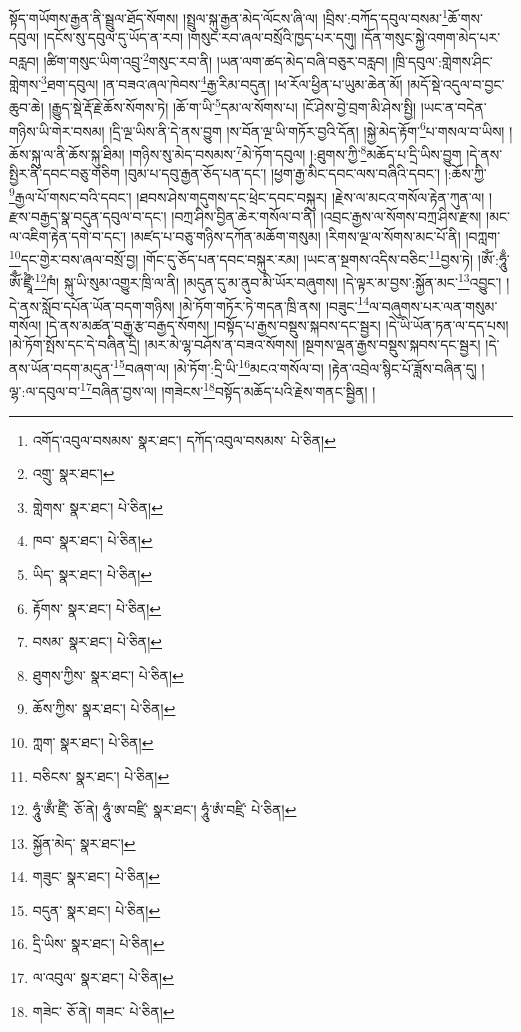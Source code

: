 སྟོད་གཡོགས་རྒྱན་ནི་སྦྲུལ་ཐོད་སོགས། །སྤྲུལ་སྐུ་རྒྱན་མེད་ལོངས་ཞི་ལ། །བྲིས་:བཀོད་དབུལ་བསམ་\footnote{འགོད་འབུལ་བསམས་  སྣར་ཐང་། དཀོད་འབུལ་བསམས་  པེ་ཅིན། }ཆོ་གས་དབུལ། །དངོས་སུ་དབུལ་དུ་ཡོད་ན་རབ། །གསུང་རབ་ཞལ་བསྲོའི་ཁྱད་པར་དགུ། །དོན་གསུང་སྐྱེ་འགག་མེད་པར་བརླབ། །ཚིག་གསུང་ཡིག་འབྲུ་\footnote{འགྲུ་  སྣར་ཐང་། }གསུང་རབ་ནི། །ཡན་ལག་ཚད་མེད་བཞི་བཅུར་བརླབ། །ཁྲི་དབུལ་:གླེགས་ཤིང་གླེགས་\footnote{གླེགས་  སྣར་ཐང་།  པེ་ཅིན། }ཐག་དབུལ། །ན་བཟའ་ཞལ་ཁེབས་\footnote{ཁབ་  སྣར་ཐང་།  པེ་ཅིན། }རྒྱ་རིམ་བདུན། །ཕ་རོལ་ཕྱིན་པ་ཡུམ་ཆེན་མོ། །མདོ་སྡེ་འདུལ་བ་བྱང་ཆུབ་ཆེ། །རྒྱུད་སྡེ་རྡོ་རྗེ་ཆོས་སོགས་ཏེ། །ཆོ་ག་ཡི་\footnote{ཡིད་  སྣར་ཐང་།  པེ་ཅིན། }དམ་ལ་སོགས་པ། །ངོ་ཤེས་བྱེ་བྲག་མི་ཤེས་སྤྱི། །ཡང་ན་བདེན་གཉིས་ཡི་གེར་བསམ། །དྲི་ལྔ་ཡིས་ནི་དེ་ནས་བྱུག །ས་བོན་ལྔ་ཡི་གཏོར་བྱའི་དོན། །སྐྱེ་མེད་རྟོག་\footnote{རྟོགས་  སྣར་ཐང་།  པེ་ཅིན། }པ་གསལ་བ་ཡིས། །ཆོས་སྐུ་ལ་ནི་ཆོས་སྐུ་ཐིམ། །གཉིས་སུ་མེད་བསམས་\footnote{བསམ་  སྣར་ཐང་།  པེ་ཅིན། }མེ་ཏོག་དབུལ། །:ཐུགས་ཀྱི་\footnote{ཐུགས་ཀྱིས་  སྣར་ཐང་།  པེ་ཅིན། }མཆོད་པ་དྲི་ཡིས་བྱུག །དེ་ནས་སྤྱིར་ནི་དབང་བཅུ་གཅིག །བུམ་པ་དབུ་རྒྱན་ཅོད་པན་དང་། །ཕྱག་རྒྱ་མིང་དབང་ལས་བཞིའི་དབང་། །:ཆོས་ཀྱི་\footnote{ཆོས་ཀྱིས་  སྣར་ཐང་།  པེ་ཅིན། }རྒྱལ་པོ་གསང་བའི་དབང་། །ཐབས་ཤེས་གདུགས་དང་ཕྲེང་དབང་བསྐུར། །རྗེས་ལ་མངའ་གསོལ་རྟེན་ཀུན་ལ། །རྫས་བརྒྱད་སྣ་བདུན་དབུལ་བ་དང་། །བཀྲ་ཤིས་བྱིན་ཆེར་གསོལ་བ་ནི། །འབྲང་རྒྱས་ལ་སོགས་བཀྲ་ཤིས་རྫས། །མང་ལ་འཇིག་རྟེན་དགེ་བ་དང་། །མཛད་པ་བཅུ་གཉིས་དཀོན་མཆོག་གསུམ། །རིགས་ལྔ་ལ་སོགས་མང་པོ་ནི། །བཀླག་\footnote{ཀླག་  སྣར་ཐང་།  པེ་ཅིན། }དང་གྱེར་བས་ཞལ་བསྲོ་བྱ། །གོང་དུ་ཅོད་པན་དབང་བསྐུར་རམ། །ཡང་ན་སྔགས་འདིས་བཅིང་\footnote{བཅིངས་  སྣར་ཐང་།  པེ་ཅིན། }བྱས་ཏེ། །ཨོཾ་:ཧཱུྃ་ཨོྃ་ཛྲཱྀཾ་\footnote{ཧཱུཾ་ཨྃ་ཛྲྀཾ་  ཅོ་ནེ། ཧཱུཾ་ཨ་བཛྲི་  སྣར་ཐང་། ཧཱུཾ་ཨཾ་བཛྲི་  པེ་ཅིན། }ཁཾ། སྐུ་ཡི་སུམ་འགྱུར་ཁྲི་ལ་ནི། །མདུན་དུ་མ་ནུབ་མི་ཡོར་བཞུགས། །དེ་ལྟར་མ་བྱས་:སྐྱོན་མང་\footnote{སྐྱོན་མེད་  སྣར་ཐང་། }འབྱུང་། །དེ་ནས་སློབ་དཔོན་ཡོན་བདག་གཉིས། །མེ་ཏོག་གཏོར་ཏེ་གདན་ཁྲི་ནས། །བཟུང་\footnote{གཟུང་  སྣར་ཐང་།  པེ་ཅིན། }ལ་བཞུགས་པར་ལན་གསུམ་གསོལ། །དེ་ནས་མཚན་བརྒྱ་རྩ་བརྒྱད་སོགས། །བསྟོད་པ་རྒྱས་བསྡུས་སྐབས་དང་སྦྱར། །དེ་ཡི་ཡོན་ཏན་ལ་དད་པས། །མེ་ཏོག་སྤོས་དང་དེ་བཞིན་དྲི། །མར་མེ་ལྷ་བཤོས་ན་བཟའ་སོགས། །སྔགས་ལྡན་རྒྱས་བསྡུས་སྐབས་དང་སྦྱར། །དེ་ནས་ཡོན་བདག་མདུན་\footnote{བདུན་  སྣར་ཐང་།  པེ་ཅིན། }བཞག་ལ། །མེ་ཏོག་:དྲི་ཡི་\footnote{དྲི་ཡིས་  སྣར་ཐང་།  པེ་ཅིན། }མངའ་གསོལ་བ། །རྟེན་འབྲེལ་སྙིང་པོ་ཟློས་བཞིན་དུ། །ལྷ་:ལ་དབུལ་བ་\footnote{ལ་འབུལ་  སྣར་ཐང་།  པེ་ཅིན། }བཞིན་བྱས་ལ། །གཟེངས་\footnote{གཟེང་  ཅོ་ནེ། གཟང་  པེ་ཅིན། }བསྟོད་མཆོད་པའི་རྗེས་གནང་སྦྱིན། །
